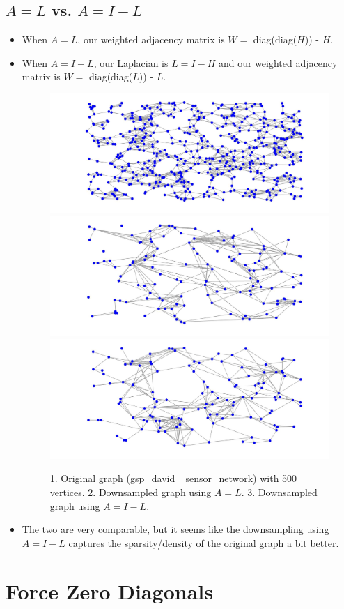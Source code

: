 \documentclass[a4paper]{article}
\begin{document}
\subsection{$A = L$ vs. $A = I - L$}
\begin{itemize}
\item When $A = L$, our weighted adjacency matrix is $W = $ diag(diag($H$)) - $H$. 
\item When $A = I - L$, our Laplacian is $L = I - H$ and our weighted adjacency matrix is $W = $ diag(diag($L$)) - $L$.

\begin{figure}[H]
\centering
\includegraphics[width = 6 cm]{clusters/original_sensor}
\includegraphics[width = 6 cm]{sensor_network/downsampled_L}
\includegraphics[width = 6 cm]{sensor_network/downsampled_I-L}

\caption{1. Original graph (gsp\_david \_sensor\_network) with 500 vertices. 2. Downsampled graph using $A = L$. 3. Downsampled graph using $A = I - L$.}
\end{figure}
\item The two are very comparable, but it seems like the downsampling using $A = I - L$ captures the sparsity/density of the original graph a bit better.
\end{itemize}

\section{Force Zero Diagonals}
\end{document}
